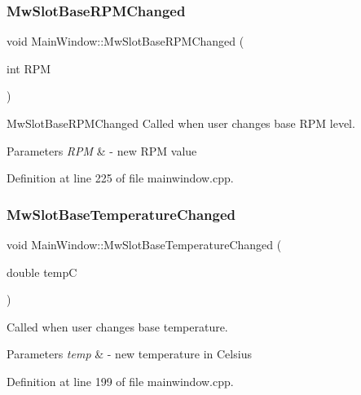 \subsubsection{\texorpdfstring{Mw\+Slot\+Base\+R\+P\+M\+Changed}{MwSlotBaseRPMChanged}}
{\footnotesize\ttfamily void Main\+Window\+::\+Mw\+Slot\+Base\+R\+P\+M\+Changed (\begin{DoxyParamCaption}\item[{int}]{R\+PM }\end{DoxyParamCaption})\hspace{0.3cm}{\ttfamily [slot]}}



Mw\+Slot\+Base\+R\+P\+M\+Changed Called when user changes base R\+PM level. 


\begin{DoxyParams}{Parameters}
{\em R\+PM} & -\/ new R\+PM value \\
\hline
\end{DoxyParams}


Definition at line 225 of file mainwindow.\+cpp.

\mbox{\label{class_main_window_a0a690287dffb47b6477f2fb50c2a818e}} 
\subsubsection{\texorpdfstring{Mw\+Slot\+Base\+Temperature\+Changed}{MwSlotBaseTemperatureChanged}}
{\footnotesize\ttfamily void Main\+Window\+::\+Mw\+Slot\+Base\+Temperature\+Changed (\begin{DoxyParamCaption}\item[{double}]{tempC }\end{DoxyParamCaption})\hspace{0.3cm}{\ttfamily [slot]}}



Called when user changes base temperature. 


\begin{DoxyParams}{Parameters}
{\em temp} & -\/ new temperature in Celsius \\
\hline
\end{DoxyParams}


Definition at line 199 of file mainwindow.\+cpp.

